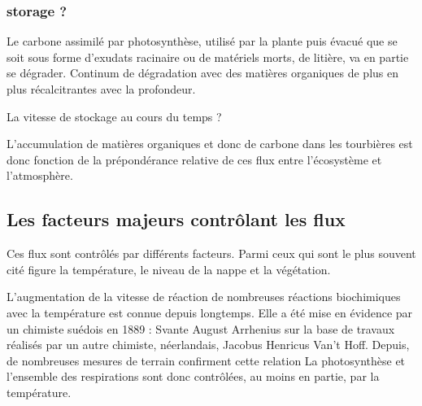 \subsubsection{storage ?}

Le carbone assimilé par photosynthèse, utilisé par la plante puis évacué que se soit sous forme d'exudats racinaire ou de matériels morts, de litière, va en partie se dégrader.
Continum de dégradation avec des matières organiques de plus en plus récalcitrantes avec la profondeur.

La vitesse de stockage au cours du temps ?

L'accumulation de matières organiques et donc de carbone dans les tourbières est donc fonction de la prépondérance relative de ces flux entre l'écosystème et l'atmosphère.

\subsection{Les facteurs majeurs contrôlant les flux}



Ces flux sont contrôlés par différents facteurs.
Parmi ceux qui sont le plus souvent cité figure la température, le niveau de la nappe et la végétation.

L'augmentation de la vitesse de réaction de nombreuses réactions biochimiques avec la température est connue depuis longtemps.
Elle a été mise en évidence par un chimiste suédois en 1889 : Svante August Arrhenius sur la base de travaux réalisés par un autre chimiste, néerlandais, Jacobus Henricus Van't Hoff.
Depuis, de nombreuses mesures de terrain confirment cette relation \plop
La photosynthèse et l'ensemble des respirations sont donc contrôlées, au moins en partie, par la température.

